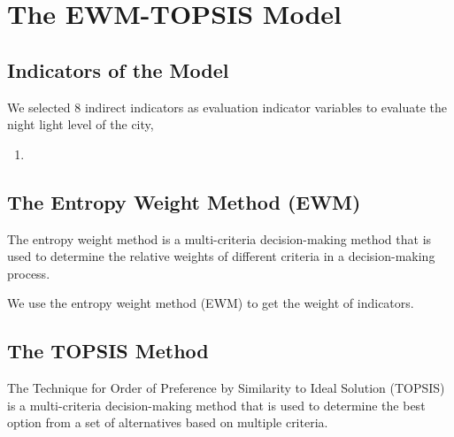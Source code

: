 \MinParskip{}

\section{The EWM-TOPSIS Model}

\subsection{Indicators of the Model}
We selected 8 indirect indicators as evaluation indicator variables to evaluate the night light level of the city,
\begin{enumerate}
    \item 
\end{enumerate}

\subsection{The Entropy Weight Method (EWM) }
The entropy weight method is a multi-criteria decision-making method that is used to determine the relative weights of different criteria in a decision-making process.

We use the entropy weight method (EWM) to get the weight of indicators.


\subsection{The TOPSIS Method}
The Technique for Order of Preference by Similarity to Ideal Solution (TOPSIS) is a multi-criteria decision-making method that is used to determine the best option from a set of alternatives based on multiple criteria. 


